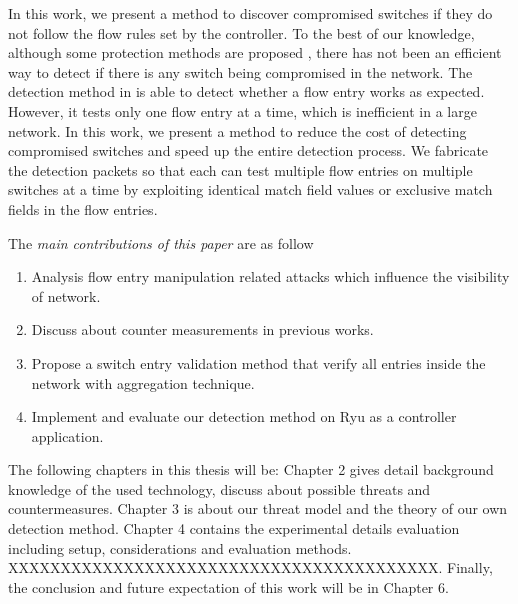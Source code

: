 In this work, we present a method to discover compromised switches if they do not follow the flow rules set by the controller. To the best of our knowledge, although some protection methods are proposed \cite{CKGL15}, there has not been an efficient way to detect if there is any switch being compromised in the network. The detection method in \cite{CKGL15} is able to detect whether a flow entry works as expected. However, it tests only one flow entry at a time, which is inefficient in a large network. In this work, we present a method to reduce the cost of detecting compromised switches and speed up the entire detection process. We fabricate the detection packets so that each can test multiple flow entries on multiple switches at a time by exploiting identical match field values or exclusive match fields in the flow entries. 

The \emph{main contributions of this paper} are as follow 
\begin{enumerate}
\item
Analysis flow entry manipulation related attacks which influence the visibility of network.
\item
Discuss about counter measurements in previous works.
\item
Propose a switch entry validation method that verify all entries inside the network with aggregation technique.
\item
Implement and evaluate our detection method on Ryu as a controller application.
\end{enumerate}

The following chapters in this thesis will be: Chapter 2 gives detail background knowledge of the used technology, discuss about possible threats and countermeasures. Chapter 3 is about our threat model and the theory of our own detection method. Chapter 4 contains the experimental details evaluation including setup, considerations and evaluation methods. XXXXXXXXXXXXXXXXXXXXXXXXXXXXXXXXXXXXXXXXX.
Finally, the conclusion and future expectation of this work will be in Chapter 6.